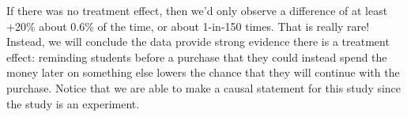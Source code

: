 If there was no treatment effect, then we'd only observe a difference of at least +20\% about 0.6\% of the time, or about 1-in-150 times. That is really rare! Instead, we will conclude the data provide strong evidence there is a treatment effect: reminding students before a purchase that they could instead spend the money later on something else lowers the chance that they will continue with the purchase. Notice that we are able to make a causal statement for this study since the study is an experiment.










%
%
%
%





